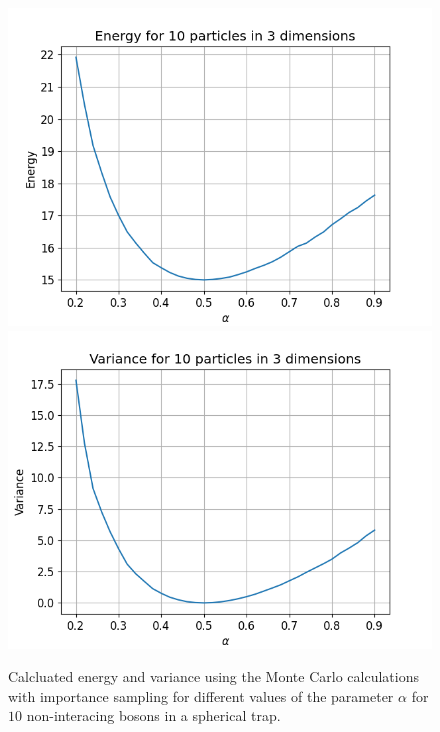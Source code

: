 \documentclass[a4paper, 10pt, english]{revtex4-2} %
\begin{document}
    \begin{figure}[!ht]
        \centering
        \includegraphics[width=\imwidth]{figures/Energy_C_10.png}
        \includegraphics[width=\imwidth]{figures/Varience_C_10.png}
        \caption{Calcluated energy and variance using the Monte Carlo calculations with importance sampling for different values of the parameter $\alpha$ for $10$ non-interacing bosons in a spherical trap.}
        \label{fig: C10}
    \end{figure}
\end{document}
